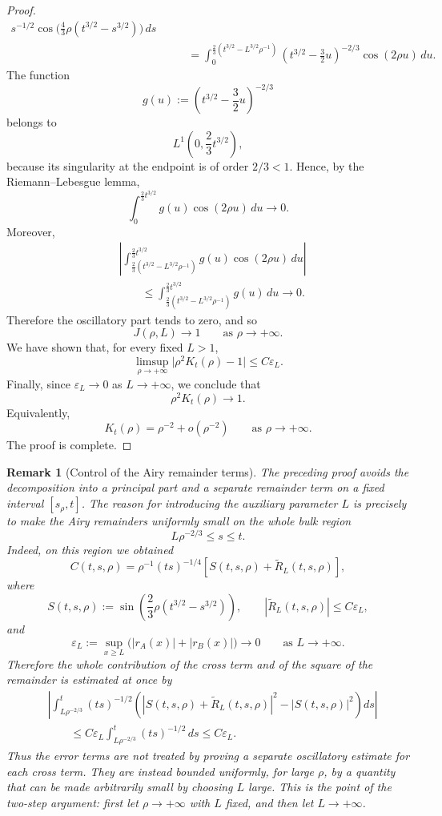 \documentclass{article}
\newtheorem{remark}[theorem]{Remark}
\begin{document}
\begin{proof}
\[\begin{aligned}
s^{-1/2}
\cos\Big(\frac43\rho(t^{3/2}-s^{3/2})\Big)\,ds      \\
&\qquad =
\int_0^{\frac23(t^{3/2}-L^{3/2}\rho^{-1})}
\left(t^{3/2}-\frac32u\right)^{-2/3}
\cos(2\rho u)\,du .
\end{aligned}
\]
The function
\[
  g(u):=
  \left(t^{3/2}-\frac32u\right)^{-2/3}
\]
belongs to
\[
  L^1\left(0,\frac23t^{3/2}\right),
\]
because its singularity at the endpoint is of order \(2/3<1\). Hence, by the Riemann--Lebesgue lemma,
\[
  \int_0^{\frac23t^{3/2}}
  g(u)\cos(2\rho u)\,du
  \longrightarrow 0 .
\]
Moreover,
\[
\begin{aligned}
&\left|
\int_{\frac23(t^{3/2}-L^{3/2}\rho^{-1})}^{\frac23t^{3/2}}
g(u)\cos(2\rho u)\,du
\right|        \\
&\qquad \le
\int_{\frac23(t^{3/2}-L^{3/2}\rho^{-1})}^{\frac23t^{3/2}}
g(u)\,du
\longrightarrow 0 .
\end{aligned}
\]
Therefore the oscillatory part tends to zero, and so
\[
  J(\rho,L)\longrightarrow 1
  \qquad \text{as } \rho\to+\infty .
\]
We have shown that, for every fixed \(L>1\),
\[
  \limsup_{\rho\to+\infty}
  \bigl|\rho^2K_t(\rho)-1\bigr|
  \le C\varepsilon_L .
\]
Finally, since \(\varepsilon_L\to0\) as \(L\to+\infty\), we conclude that
\[
  \rho^2K_t(\rho)\longrightarrow 1 .
\]
Equivalently,
\[
  K_t(\rho)=\rho^{-2}+o(\rho^{-2})
  \qquad \text{as } \rho\to+\infty .
\]
The proof is complete.
\end{proof}

\begin{remark}[Control of the Airy remainder terms]\label{cross}
The preceding proof avoids the decomposition into a principal part and a separate remainder term on a fixed interval
\([s_\rho,t]\).  The reason for introducing the auxiliary parameter \(L\) is precisely to make the Airy remainders uniformly small on the whole bulk region
\[
   L\rho^{-2/3}\le s\le t.
\]
Indeed, on this region we obtained
\[
C(t,s,\rho)
=
\rho^{-1}(ts)^{-1/4}
\left[
S(t,s,\rho)+\widetilde R_L(t,s,\rho)
\right],
\]
where
\[
   S(t,s,\rho)
   :=
   \sin\!\left(\frac23\rho(t^{3/2}-s^{3/2})\right),
   \qquad
   |\widetilde R_L(t,s,\rho)|\le C\varepsilon_L,
\]
and
\[
   \varepsilon_L:=\sup_{x\ge L}\big(|r_A(x)|+|r_B(x)|\big)\to0
   \qquad\text{as }L\to+\infty.
\]
Therefore the whole contribution of the cross term and of the square of the remainder is estimated at once by
\[
\begin{aligned}
&\left|
\int_{L\rho^{-2/3}}^t
(ts)^{-1/2}
\left(
 |S(t,s,\rho)+\widetilde R_L(t,s,\rho)|^2
 -|S(t,s,\rho)|^2
\right)ds
\right|                                      \\
&\qquad\le
C\varepsilon_L
\int_{L\rho^{-2/3}}^t (ts)^{-1/2}\,ds
\le C\varepsilon_L .
\end{aligned}
\]
Thus the error terms are not treated by proving a separate oscillatory estimate for each cross term.  They are instead bounded uniformly, for large \(\rho\), by a quantity that can be made arbitrarily small by choosing \(L\) large.  This is the point of the two-step argument: first let \(\rho\to+\infty\) with \(L\) fixed, and then let \(L\to+\infty\).
\end{remark}
\end{document}
